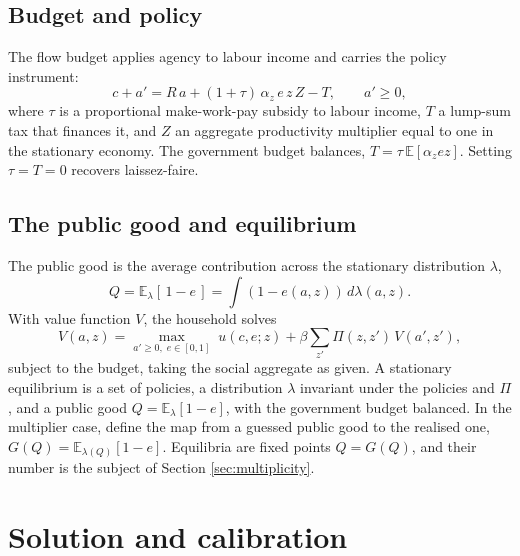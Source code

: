 \documentclass[11pt]{article}
\begin{document}
\subsection{Budget and policy}

The flow budget applies agency to labour income and carries the policy instrument:
\begin{equation}
c + a' = R\,a + (1+\tau)\,\alpha_z\, e\, z\, Z - T, \qquad a' \ge 0,
\end{equation}
where $\tau$ is a proportional make-work-pay subsidy to labour income, $T$ a lump-sum tax that finances it, and $Z$ an aggregate productivity multiplier equal to one in the stationary economy. The government budget balances, $T = \tau\,\mathbb{E}[\alpha_z e z]$. Setting $\tau = T = 0$ recovers laissez-faire.

\subsection{The public good and equilibrium}

The public good is the average contribution across the stationary distribution $\lambda$,
\begin{equation}
Q = \mathbb{E}_\lambda[\,1-e\,] = \int (1-e(a,z))\, d\lambda(a,z).
\end{equation}
With value function $V$, the household solves
\begin{equation}
V(a,z) = \max_{a'\ge 0,\; e\in[0,1]} \; u(c,e;z) + \beta \sum_{z'}\Pi(z,z')\,V(a',z'),
\end{equation}
subject to the budget, taking the social aggregate as given. A stationary equilibrium is a set of policies, a distribution $\lambda$ invariant under the policies and $\Pi$, and a public good $Q = \mathbb{E}_\lambda[1-e]$, with the government budget balanced. In the multiplier case, define the map from a guessed public good to the realised one, $G(Q) = \mathbb{E}_{\lambda(Q)}[1-e]$. Equilibria are fixed points $Q = G(Q)$, and their number is the subject of Section \ref{sec:multiplicity}.

\section{Solution and calibration}
\end{document}
